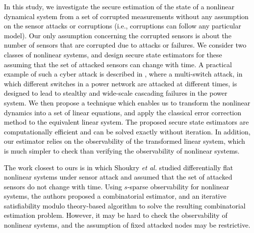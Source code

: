 \textcolor{black}{In this study, we investigate the secure estimation of the state of a nonlinear dynamical system from a set of corrupted measurements without any assumption on the sensor attacks or corruptions (i.e., corruptions can follow any particular model). Our only assumption concerning the corrupted sensors is about the number of sensors that are corrupted due to attacks or failures. We consider two classes of nonlinear systems, and design secure state estimators for \textcolor{black}{these} assuming that the set of attacked sensors can change with time. \textcolor{black}{A practical example of such a cyber attack is described in \cite{liu2014coordinated}, where a multi-switch attack, in which different switches in a power network are attacked at different times, is designed to lead to stealthy and wide-scale cascading failures in the power system.}
We then propose a technique which enables us to transform the nonlinear dynamics into a set of linear equations, and apply the classical error correction method to the equivalent linear system. The proposed secure state estimators are computationally efficient and can be solved exactly without iteration. \textcolor{black}{In addition, our estimator relies on the observability of the transformed linear system, which is much simpler to check than verifying the observability of nonlinear systems.}} %






\textcolor{black}{The work closest to ours is \cite{shoukry} in which Shoukry \textit{et al.} studied differentially flat nonlinear systems under sensor attack and assumed that the set of attacked sensors do not change with time. Using $s$-sparse observability for nonlinear systems, the authors proposed a combinatorial estimator, and an iterative satisfiability modulo theory-based algorithm to solve the resulting combinatorial estimation problem. However, it may be hard to check the observability of nonlinear systems, and the assumption of fixed attacked nodes may be restrictive.}





